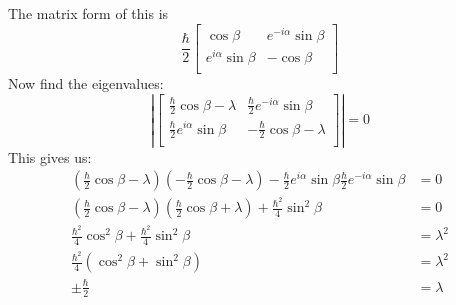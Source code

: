 The matrix form of this is
\[
\frac{\hbar}{2}
\begin{bmatrix}
  \cos\beta & e^{-i\alpha}\sin\beta \\
  e^{i\alpha}\sin\beta & -\cos\beta \\
\end{bmatrix}
\]
Now find the eigenvalues:
\[
\left|
\begin{bmatrix}
  \frac{\hbar}{2}\cos\beta - \lambda & \frac{\hbar}{2}e^{-i\alpha}\sin\beta \\
  \frac{\hbar}{2}e^{i\alpha}\sin\beta & -\frac{\hbar}{2}\cos\beta - \lambda \\
\end{bmatrix}
\right|
= 0
\]
This gives us:
\begin{align*}
  \left(\frac{\hbar}{2}\cos\beta - \lambda\right)
  \left(-\frac{\hbar}{2}\cos\beta - \lambda\right)
  -\frac{\hbar}{2}e^{i\alpha}\sin\beta
  \frac{\hbar}{2}e^{-i\alpha}\sin\beta &= 0 \\
  \left(\frac{\hbar}{2}\cos\beta - \lambda\right)
  \left(\frac{\hbar}{2}\cos\beta + \lambda\right)
  +\frac{\hbar^2}{4}\sin^2\beta &= 0 \\
  \frac{\hbar^2}{4}\cos^2\beta + \frac{\hbar^2}{4}\sin^2\beta &= \lambda^2 \\
  \frac{\hbar^2}{4}(\cos^2\beta + \sin^2\beta) &= \lambda^2 \\
  \pm\frac{\hbar}{2} &= \lambda \\
\end{align*}

